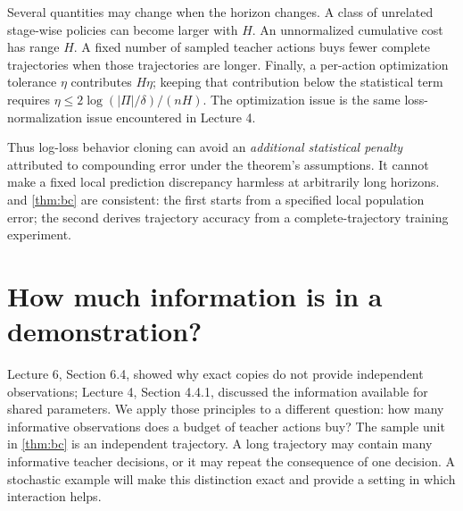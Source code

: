 \documentclass[11pt,twoside]{article}
\theoremstyle{definition}
\theoremstyle{remark}
\begin{document}
Several quantities may change when the horizon changes. A class of
unrelated stage-wise policies can become larger with $H$. An unnormalized
cumulative cost has range $H$. A fixed number of sampled teacher actions
buys fewer complete trajectories when those trajectories are longer.
Finally, a per-action optimization tolerance $\eta$ contributes $H\eta$;
keeping that contribution below the statistical term requires
$\eta\le 2\log(|\Pi|/\delta)/(nH)$. The optimization issue is the same
loss-normalization issue encountered in Lecture 4.

Thus log-loss behavior cloning can avoid an \emph{additional statistical
penalty} attributed to compounding error under the theorem's assumptions.
It cannot make a fixed local prediction discrepancy harmless at arbitrarily
long horizons.  and \cref{thm:bc} are consistent:
the first starts from a specified local population error; the second derives
trajectory accuracy from a complete-trajectory training experiment.

\section{How much information is in a demonstration?}
\label{sec:information}

Lecture 6, Section 6.4, showed why exact copies do not provide independent
observations; Lecture 4, Section 4.4.1, discussed the information available
for shared parameters. We apply those principles to a different question:
how many informative observations does a budget of teacher actions buy?
The sample unit in \cref{thm:bc} is an independent trajectory. A long
trajectory may contain many informative teacher decisions, or it may repeat
the consequence of one decision. A stochastic example will make this
distinction exact and provide a setting in which interaction helps.
\end{document}
